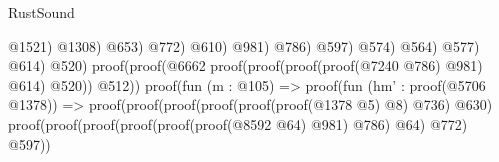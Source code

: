 \begin{lexlean}{RustSound}
\begin{coremodule}
                                                                                  @1521)
                                                                                @1308)
                                                                              @653)
                                                                            @772)
                                                                          @610)
                                                                        @981)
                                                                      @786)
                                                                    @597)
                                                                  @574)
                                                                @564)
                                                              @577)
                                                            @614)
                                                          @520)
                                                        proof(proof(@6662
                                                              proof(proof(proof(proof(@7240 @786)
                                                                      @981)
                                                                    @614)
                                                                  @520))
                                                            @512))
                                                      proof(fun (m : @105) =>
                                                        proof(fun (hm' : proof(@5706 @1378)) =>
                                                          proof(proof(proof(proof(proof(proof(@1378
                                                                        @5)
                                                                      @8)
                                                                    @736)
                                                                  @630)
                                                                proof(proof(proof(proof(proof(proof(@8592
                                                                              @64)
                                                                            @981)
                                                                          @786)
                                                                        @64)
                                                                      @772)
                                                                    @597))

\end{coremodule}
\end{lexlean}
